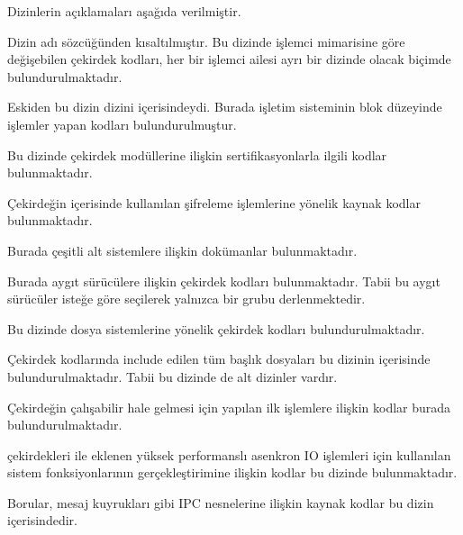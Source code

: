 \documentclass[a4paper,10pt,turkish]{sphinxmanual}
\begin{document}
\sphinxAtStartPar
Dizinlerin açıklamaları aşağıda verilmiştir.
\begin{description}
\sphinxAtStartPar
Dizin adı  sözcüğünden kısaltılmıştır. Bu dizinde işlemci mimarisine göre
değişebilen çekirdek kodları, her bir işlemci ailesi ayrı bir dizinde olacak biçimde
bulundurulmaktadır.

\sphinxAtStartPar
Eskiden bu dizin  dizini içerisindeydi. Burada işletim sisteminin blok düzeyinde
işlemler yapan kodları bulundurulmuştur.

\sphinxAtStartPar
Bu dizinde çekirdek modüllerine ilişkin sertifikasyonlarla ilgili kodlar bulunmaktadır.

\sphinxAtStartPar
Çekirdeğin içerisinde kullanılan şifreleme işlemlerine yönelik kaynak kodlar
bulunmaktadır.

\sphinxAtStartPar
Burada çeşitli alt sistemlere ilişkin dokümanlar bulunmaktadır.

\sphinxAtStartPar
Burada aygıt sürücülere ilişkin çekirdek kodları bulunmaktadır. Tabii bu aygıt sürücüler
isteğe göre seçilerek yalnızca bir grubu derlenmektedir.

\sphinxAtStartPar
Bu dizinde dosya sistemlerine yönelik çekirdek kodları bulundurulmaktadır.

\sphinxAtStartPar
Çekirdek kodlarında include edilen tüm başlık dosyaları bu dizinin içerisinde
bulundurulmaktadır. Tabii bu dizinde de alt dizinler vardır.

\sphinxAtStartPar
Çekirdeğin çalışabilir hale gelmesi için yapılan ilk işlemlere ilişkin kodlar burada
bulundurulmaktadır.

 çekirdekleri ile eklenen yüksek performanslı asenkron IO işlemleri için kullanılan
sistem fonksiyonlarının gerçekleştirimine ilişkin kodlar bu dizinde bulunmaktadır.

\sphinxAtStartPar
Borular, mesaj kuyrukları gibi IPC nesnelerine ilişkin kaynak kodlar bu dizin
içerisindedir.


\end{description}
\end{document}
